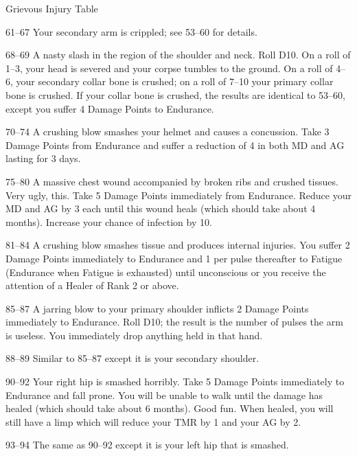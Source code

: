 \begin{Chapter}{Grievous Injury Table}
\begin{Description}
\item[61–67] Your secondary arm is crippled; see 53–60 for details.

\item[68–69] A nasty slash in the region of the shoulder and
  neck. Roll D10. On a roll of 1–3, your head is severed and your
  corpse tumbles to the ground. On a roll of 4–6, your secondary
  collar bone is crushed; on a roll of 7–10 your primary collar bone
  is crushed. If your collar bone is crushed, the results are
  identical to 53–60, except you suffer 4 Damage Points to Endurance.

\item[70–74] A crushing blow smashes your helmet and causes a
  concussion. Take 3 Damage Points from Endurance and suffer a
  reduction of 4 in both MD and AG lasting for 3 days.

\item[75–80] A massive chest wound accompanied by broken ribs and
  crushed tissues. Very ugly, this. Take 5 Damage Points immediately
  from Endurance. Reduce your MD and AG by 3 each until this wound
  heals (which should take about 4 months).  Increase your chance of
  infection by 10.

\item[81–84] A crushing blow smashes tissue and produces internal
  injuries. You suffer 2 Damage Points immediately to Endurance and 1
  per pulse thereafter to Fatigue (Endurance when Fatigue is
  exhausted) until unconscious or you receive the attention of a
  Healer of Rank 2 or above.

\item[85–87] A jarring blow to your primary shoulder inflicts 2 Damage
  Points immediately to Endurance. Roll D10; the result is the number
  of pulses the arm is useless. You immediately drop anything held in
  that hand.

\item[88–89] Similar to 85–87 except it is your secondary shoulder.

\item[90–92] Your right hip is smashed horribly. Take 5 Damage Points
  immediately to Endurance and fall prone. You will be unable to walk
  until the damage has healed (which should take about 6 months). Good
  fun.  When healed, you will still have a limp which will reduce your
  TMR by 1 and your AG by 2.

\item[93–94] The same as 90–92 except it is your left hip that is
  smashed.


\end{Description}
\end{Chapter}

